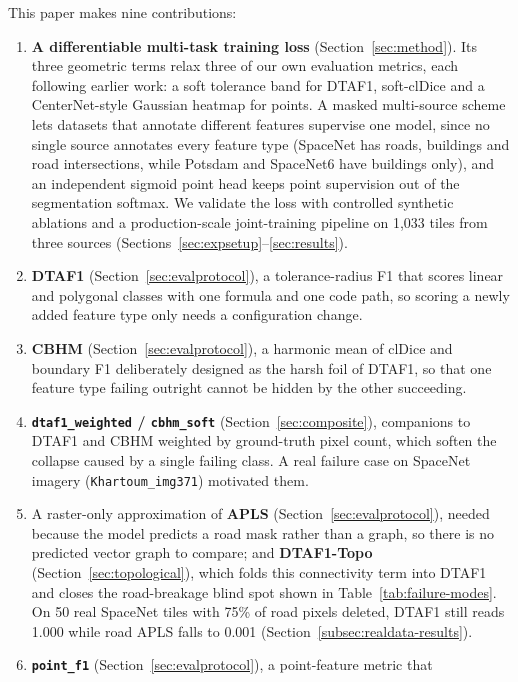 This paper makes nine contributions:

\begin{enumerate}
  \item \textbf{A differentiable multi-task training loss} (Section~\ref{sec:method}). Its three
    geometric terms relax three of our own evaluation metrics, each following earlier work: a
    soft tolerance band for DTAF1, soft-clDice \cite{shit2021cldice} and a
    CenterNet-style Gaussian heatmap for points. A masked multi-source scheme lets datasets that
    annotate different features supervise one model, since no single source annotates every
    feature type (SpaceNet has roads, buildings and road intersections, while Potsdam and
    SpaceNet6 have buildings only), and an independent sigmoid point head keeps point supervision
    out of the segmentation softmax. We validate the loss with controlled synthetic ablations and a
    production-scale joint-training pipeline on 1,033 tiles from three sources
    (Sections~\ref{sec:expsetup}--\ref{sec:results}).
  \item \textbf{DTAF1} (Section~\ref{sec:evalprotocol}), a tolerance-radius F1 that scores linear and polygonal classes with one formula and one code path, so scoring a
    newly added feature type only needs a configuration change.
  \item \textbf{CBHM} (Section~\ref{sec:evalprotocol}), a harmonic mean of clDice and boundary F1
    deliberately designed as the harsh foil of DTAF1, so that one feature type failing outright
    cannot be hidden by the other succeeding.
  \item \textbf{\texttt{dtaf1\_weighted} / \texttt{cbhm\_soft}} (Section~\ref{sec:composite}),
    companions to DTAF1 and CBHM weighted by ground-truth pixel count, which soften the collapse
    caused by a single failing class. A real failure case on SpaceNet imagery
    (\texttt{Khartoum\_img371}) motivated them.
  \item A raster-only approximation of \textbf{APLS} (Section~\ref{sec:evalprotocol}), needed
    because the model predicts a road mask rather than a graph, so there is no predicted vector
    graph to compare; and \textbf{DTAF1-Topo} (Section~\ref{sec:topological}), which folds this
    connectivity term into DTAF1 and closes the road-breakage blind spot shown in
    Table~\ref{tab:failure-modes}. On 50 real SpaceNet tiles with 75\% of road pixels deleted,
    DTAF1 still reads 1.000 while road APLS falls to 0.001 (Section~\ref{subsec:realdata-results}).
  \item \textbf{\texttt{point\_f1}} (Section~\ref{sec:evalprotocol}), a point-feature metric that

\end{enumerate}

